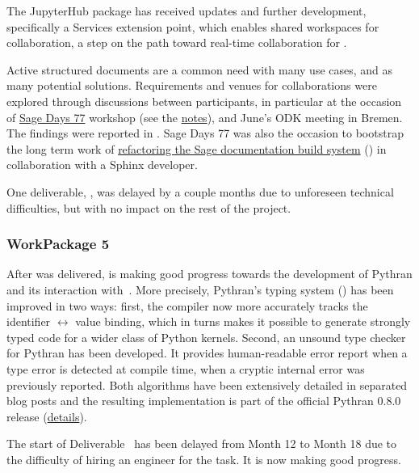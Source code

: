 \documentclass{deliverablereport}
\begin{document}
The JupyterHub package has received updates and further development,
specifically a Services extension point, which enables shared
workspaces for collaboration, a step on the path toward real-time
collaboration for .

Active structured documents are a common need with many use cases, and
as many potential solutions. Requirements and venues for
collaborations were explored through discussions between participants,
in particular at the occasion of
\href{https://wiki.sagemath.org/days77/}{Sage Days 77} workshop (see
the
\href{https://wiki.sagemath.org/days77/live-structured-documents}{notes}),
and June's ODK meeting in Bremen. The findings were reported in
. Sage Days 77 was also the occasion to bootstrap
the long term work of
\href{https://wiki.sagemath.org/days77/documentation}{refactoring the
  Sage documentation build system} () in
collaboration with a Sphinx developer.

One deliverable, , was delayed by a
couple months due to unforeseen technical difficulties, but with no
impact on the rest of the project.


\subsubsection{WorkPackage 5}
After  was delivered,
 is making good progress towards the
development of Pythran and its interaction with~\Sage.
%
More precisely, Pythran's typing system () has
been improved in two ways: first, the compiler now more accurately tracks the
identifier $\leftrightarrow$ value binding, which in turns makes it possible to
generate strongly typed code for a wider class of Python kernels.  Second, an
unsound type checker for Pythran has been developed. It provides human-readable
error report when a type error is detected at compile time, when a cryptic
internal error was previously reported. Both algorithms have been extensively
detailed in separated blog posts and the resulting implementation is part of
the official Pythran 0.8.0 release
(\href{https://github.com/OpenDreamKit/OpenDreamKit/issues/117}{details}).

The start of Deliverable~ has been delayed from
Month 12 to Month 18 due to the difficulty of hiring an engineer for the task.
It is now making good progress.
\end{document}
